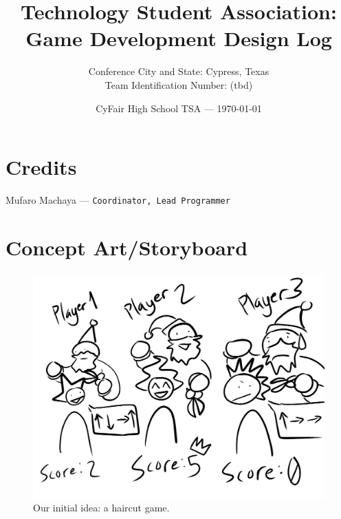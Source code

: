 \documentclass[11pt]{article}
\title{Technology Student Association:\\Game Development Design Log} %
\author{
	Conference City and State: Cypress, Texas \\
	Team Identification Number: (tbd)
}
\date{CyFair High School TSA --- \today}
\begin{document}
\maketitle %

\pagebreak


\section*{Credits}

Mufaro Machaya --- \texttt{Coordinator, Lead Programmer} \\ %

\section{Concept Art/Storyboard}

\begin{figure}
	\includegraphics[width=\linewidth]{concept_art/haircut.png}
	\caption{Our initial idea: a haircut game.}
	\label{fig:haircut}
\end{figure}
\end{document}
